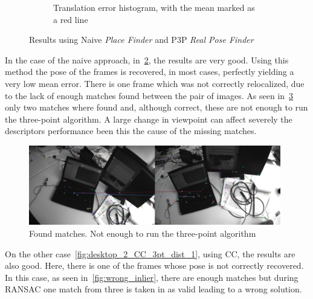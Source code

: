 \begin{figure}[htpb]
\begin{subfigure}[b]{6cm}
          \caption{Translation error histogram, with the mean marked as a red line}                
          \label{fig:desktop_2_naive_3pt_dist_1}
  \end{subfigure}
  \caption{Results using Naive \textit{Place Finder} and P3P  \textit{Real Pose Finder}}
\end{figure}

In the case of the naive approach, in~\ref{fig:desktop_2_naive_3pt_dist_1}, the results are very good. Using this method the pose of the frames is recovered, in most cases, perfectly yielding a very low mean error. There is one frame which was not correctly relocalized, due to the lack of enough matches found between the pair of images. As seen in~\ref{fig:not_enough_matches} only two matches where found and, although correct, these are not enough to run the three-point algorithm. A large change in viewpoint can affect severely the descriptors performance been this the cause of the missing matches.\\

\begin{figure}[htpb]
  \centering
  \includegraphics[width=11cm]{img/not_enough_matches.png}
  \caption{Found matches. Not enough to run the three-point algorithm}
  \label{fig:not_enough_matches}
\end{figure}

On the other case~\ref{fig:desktop_2_CC_3pt_dist_1}, using CC, the results are also good. Here, there is one of the frames whose pose is not correctly recovered. In this case, as seen in~\ref{fig:wrong_inlier}, there are enough matches but during RANSAC one match from three is taken in as valid leading to a wrong solution.\\


